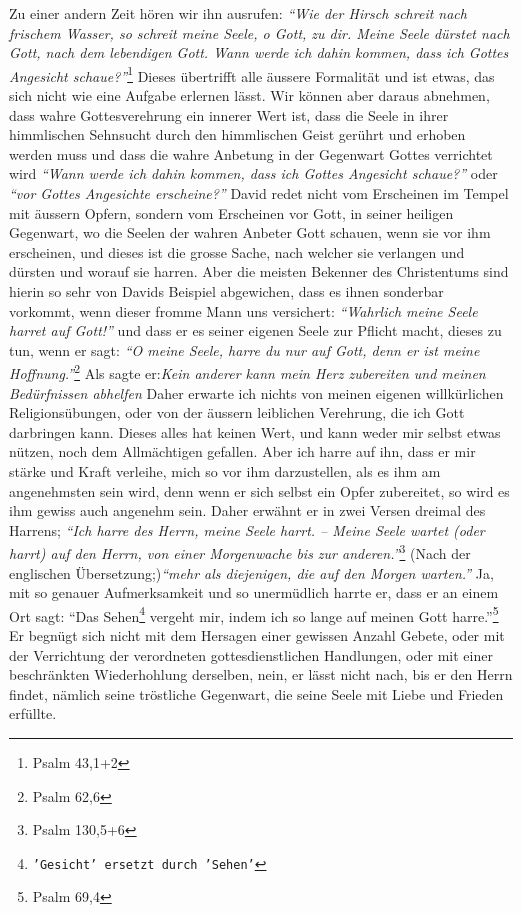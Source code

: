   Zu einer andern Zeit hören wir ihn
ausrufen:
\textit{"`Wie der Hirsch schreit nach
frischem Wasser, so schreit meine Seele, o Gott, zu dir. Meine Seele dürstet
nach Gott, nach dem lebendigen Gott. Wann werde ich dahin kommen, dass ich
Gottes Angesicht schaue?"'}\footnote{Psalm 43,1+2}
Dieses übertrifft alle äussere
Formalität  und ist etwas, das sich nicht wie eine
Aufgabe erlernen lässt. Wir
können aber daraus abnehmen, dass wahre Gottesverehrung ein innerer Wert ist,
dass die Seele in ihrer himmlischen Sehnsucht durch den himmlischen Geist
gerührt und erhoben werden muss und dass die wahre Anbetung in der Gegenwart
Gottes verrichtet wird
\textit{"`Wann werde ich dahin kommen, dass ich Gottes
Angesicht schaue?"'} oder \textit{"`vor Gottes Angesichte erscheine?"'} David
redet nicht
vom Erscheinen im Tempel  mit äussern Opfern, sondern
vom Erscheinen vor Gott, in
seiner heiligen Gegenwart, wo die Seelen der wahren Anbeter Gott schauen, wenn
sie vor ihm erscheinen, und dieses ist die grosse Sache, nach welcher sie
verlangen und dürsten und worauf sie harren. Aber die meisten Bekenner des
Christentums sind hierin so sehr von Davids Beispiel abgewichen, dass es ihnen
sonderbar vorkommt, wenn dieser fromme Mann uns versichert:
\textit{"`Wahrlich meine Seele harret auf Gott!"'}
und dass er es seiner eigenen Seele zur Pflicht macht,
dieses zu tun, wenn er sagt:
\textit{"`O meine Seele, harre du nur auf Gott, denn er ist meine
Hoffnung."'}\footnote{Psalm 62,6}
Als sagte er:\textit{Kein anderer kann mein Herz
zubereiten und meinen Bedürfnissen abhelfen} Daher erwarte ich nichts von meinen
eigenen willkürlichen Religionsübungen,
oder von der äussern leiblichen
Verehrung, die ich Gott darbringen kann. Dieses alles hat keinen Wert, und kann
weder mir selbst etwas nützen, noch dem Allmächtigen gefallen. Aber ich
harre auf ihn, dass er mir stärke und Kraft verleihe, mich so vor ihm
darzustellen, als es ihm am angenehmsten sein wird, denn wenn er sich selbst ein
Opfer  zubereitet, so wird es ihm gewiss auch angenehm
sein. Daher erwähnt er in
zwei Versen dreimal des Harrens;
\textit{"`Ich harre des Herrn, meine Seele harrt. --
Meine Seele wartet (oder harrt) auf den Herrn, von einer Morgenwache bis zur
anderen."'}\footnote{Psalm 130,5+6}
(Nach der englischen Übersetzung;)\textit{"`mehr als
diejenigen, die auf den Morgen warten."'} Ja, mit so genauer Aufmerksamkeit und
so unermüdlich harrte er, dass er an einem Ort sagt:
"`Das Sehen\footnote{\texttt{'Gesicht' ersetzt durch 'Sehen'}} vergeht mir,
indem ich so lange auf meinen Gott harre."'\footnote{Psalm 69,4}
Er begnügt sich
nicht mit dem Hersagen einer gewissen Anzahl Gebete,
oder mit der Verrichtung
der verordneten gottesdienstlichen Handlungen, oder mit einer beschränkten
Wiederhohlung derselben, nein, er lässt nicht nach, bis er den Herrn findet,
nämlich seine tröstliche Gegenwart, die seine Seele mit Liebe und Frieden
erfüllte.

